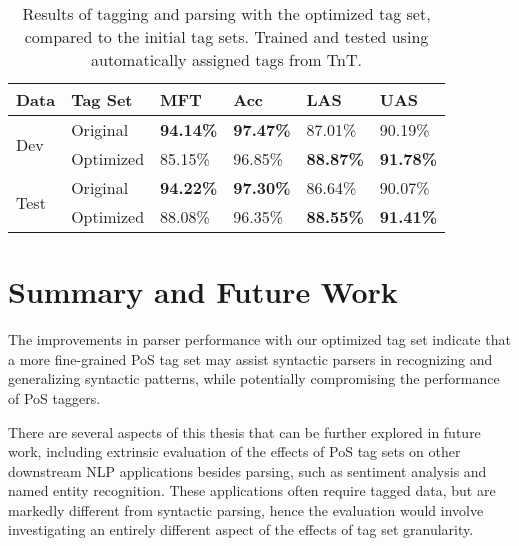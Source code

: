 \documentclass[11pt,a4paper]{article}
\begin{document}
\begin{table}
    \centering
    \smaller[0.5]
    \begin{tabular}{@{}llllll@{}}
        \toprule
        \textbf{Data} & \textbf{Tag Set} & \textbf{MFT} & \textbf{Acc} &
        \textbf{LAS} & \textbf{UAS} \\
        \midrule
        \multirow{2}{*}{Dev}
        & Original & \textbf{94.14\%} & \textbf{97.47\%} & 87.01\% & 90.19\% \\
        & Optimized & 85.15\% & 96.85\% & \textbf{88.87\%} & \textbf{91.78\%} \\
        \midrule
        \multirow{2}{*}{Test}
        & Original & \textbf{94.22\%} & \textbf{97.30\%} & 86.64\% & 90.07\% \\
        & Optimized & 88.08\% & 96.35\% & \textbf{88.55\%} & \textbf{91.41\%} \\
        \bottomrule
    \end{tabular}
    \caption{Results of tagging and parsing with the optimized tag set,
        compared to the initial tag sets. Trained and tested using
        automatically assigned tags from TnT.}
    \label{finalresults}
\end{table}


\section{Summary and Future Work}
\label{sec:summary}
The improvements in parser performance with our optimized tag set indicate that
a more fine-grained PoS tag set may assist syntactic parsers in recognizing and
generalizing syntactic patterns, while potentially compromising the performance
of PoS taggers.

There are several aspects of this thesis that can be further explored in future
work, including extrinsic evaluation of the effects of PoS tag sets on other
downstream NLP applications besides parsing, such as sentiment analysis and
named entity recognition. These applications often require tagged data, but are
markedly different from syntactic parsing, hence the evaluation would involve
investigating an entirely different aspect of the effects of tag set
granularity.




\end{document}
